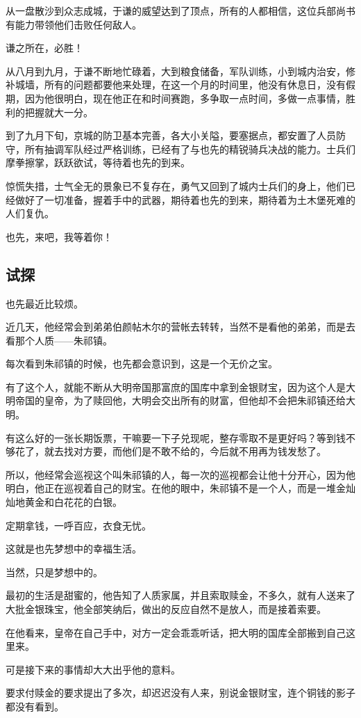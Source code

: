\begin{multicols}{\theparacolNo}
从一盘散沙到众志成城，于谦的威望达到了顶点，所有的人都相信，这位兵部尚书有能力带领他们击败任何敌人。

谦之所在，必胜！

从八月到九月，于谦不断地忙碌着，大到粮食储备，军队训练，小到城内治安，修补城墙，所有的问题都要他来处理，在这一个月的时间里，他没有休息日，没有假期，因为他很明白，现在他正在和时间赛跑，多争取一点时间，多做一点事情，胜利的把握就大一分。

到了九月下旬，京城的防卫基本完善，各大小关隘，要塞据点，都安置了人员防守，所有抽调军队经过严格训练，已经有了与也先的精锐骑兵决战的能力。士兵们摩拳擦掌，跃跃欲试，等待着也先的到来。

惊慌失措，士气全无的景象已不复存在，勇气又回到了城内士兵们的身上，他们已经做好了一切准备，握着手中的武器，期待着也先的到来，期待着为土木堡死难的人们复仇。

也先，来吧，我等着你！

\subsection{试探}
也先最近比较烦。

近几天，他经常会到弟弟伯颜帖木尔的营帐去转转，当然不是看他的弟弟，而是去看那个人质——朱祁镇。

每次看到朱祁镇的时候，也先都会意识到，这是一个无价之宝。

有了这个人，就能不断从大明帝国那富庶的国库中拿到金银财宝，因为这个人是大明帝国的皇帝，为了赎回他，大明会交出所有的财富，但他却不会把朱祁镇还给大明。

有这么好的一张长期饭票，干嘛要一下子兑现呢，整存零取不是更好吗？等到钱不够花了，就去找对方要，而他们是不敢不给的，今后就不用再为钱发愁了。

所以，他经常会巡视这个叫朱祁镇的人，每一次的巡视都会让他十分开心，因为他明白，他正在巡视着自己的财宝。在他的眼中，朱祁镇不是一个人，而是一堆金灿灿地黄金和白花花的白银。

定期拿钱，一呼百应，衣食无忧。

这就是也先梦想中的幸福生活。

当然，只是梦想中的。

最初的生活是甜蜜的，他告知了人质家属，并且索取赎金，不多久，就有人送来了大批金银珠宝，他全部笑纳后，做出的反应自然不是放人，而是接着索要。

在他看来，皇帝在自己手中，对方一定会乖乖听话，把大明的国库全部搬到自己这里来。

可是接下来的事情却大大出乎他的意料。

要求付赎金的要求提出了多次，却迟迟没有人来，别说金银财宝，连个铜钱的影子都没有看到。


\end{multicols}
